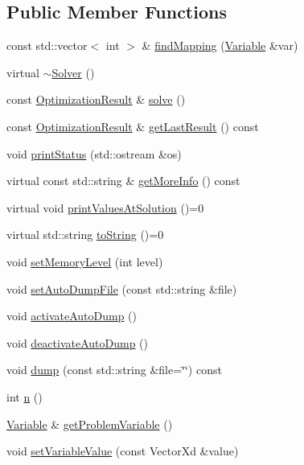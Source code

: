 \subsection*{Public Member Functions}
\begin{DoxyCompactItemize}
\item 
const std\+::vector$<$ int $>$ \& \hyperlink{classocra_1_1Solver_a67ee15c2dd55a5345f3872b35fca59cd}{find\+Mapping} (\hyperlink{classocra_1_1Variable}{Variable} \&var)
\item 
virtual \hyperlink{classocra_1_1Solver_a9919a7070eddaaeefda307a0d4bc0aa9}{$\sim$\+Solver} ()
\item 
const \hyperlink{structocra_1_1OptimizationResult}{Optimization\+Result} \& \hyperlink{classocra_1_1Solver_a86151fea09399da16d6ce47abb1ba904}{solve} ()
\item 
const \hyperlink{structocra_1_1OptimizationResult}{Optimization\+Result} \& \hyperlink{classocra_1_1Solver_a0934a0ace12fc8a386b2191b703f5f97}{get\+Last\+Result} () const 
\item 
void \hyperlink{classocra_1_1Solver_a6126d57ab3704acaec99525087ced070}{print\+Status} (std\+::ostream \&os)
\item 
virtual const std\+::string \& \hyperlink{classocra_1_1Solver_a8d3ac613fc5ccc0919b8caee9b30a2f8}{get\+More\+Info} () const 
\item 
virtual void \hyperlink{classocra_1_1Solver_ab1903098e25c16a9f92c36d37967e8fa}{print\+Values\+At\+Solution} ()=0
\item 
virtual std\+::string \hyperlink{classocra_1_1Solver_ab3783d1c208500bfb1daa3e1abf34146}{to\+String} ()=0
\item 
void \hyperlink{classocra_1_1Solver_a173cf07771133096beec4a7d5aefe00d}{set\+Memory\+Level} (int level)
\item 
void \hyperlink{classocra_1_1Solver_a913b2bf9a6d9f64c70ad1b5fbb09172f}{set\+Auto\+Dump\+File} (const std\+::string \&file)
\item 
void \hyperlink{classocra_1_1Solver_abe008748e898aff38d0c13c4c9edbe5a}{activate\+Auto\+Dump} ()
\item 
void \hyperlink{classocra_1_1Solver_a4b766c5ed75ce93245fecb64ae115adb}{deactivate\+Auto\+Dump} ()
\item 
void \hyperlink{classocra_1_1Solver_aaae2203418b8d3658f3f7b021d1b82b3}{dump} (const std\+::string \&file=\char`\"{}\char`\"{}) const 
\item 
int \hyperlink{classocra_1_1Solver_a63e73904de66df69372ed91c6b9d058b}{n} ()
\item 
\hyperlink{classocra_1_1Variable}{Variable} \& \hyperlink{classocra_1_1Solver_ad80a950db015620c2eb43cbaab5ca51f}{get\+Problem\+Variable} ()
\item 
void \hyperlink{classocra_1_1Solver_ac67fe8faaf3355f3430b5fed881832fe}{set\+Variable\+Value} (const Vector\+Xd \&value)
\end{DoxyCompactItemize}
